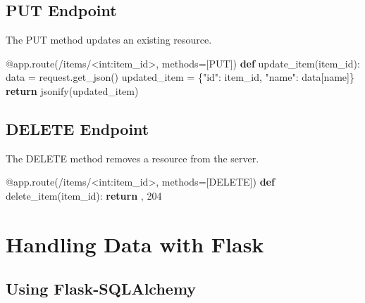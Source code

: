 \documentclass[
  letterpaper,
  DIV=11,
  numbers=noendperiod]{scrreprt}
\newenvironment{Shaded}{\begin{snugshade}}{\end{snugshade}}
\newcommand{\AttributeTok}[1]{\textcolor[rgb]{0.40,0.45,0.13}{#1}}
\newcommand{\ControlFlowTok}[1]{\textcolor[rgb]{0.00,0.23,0.31}{\textbf{#1}}}
\newcommand{\DecValTok}[1]{\textcolor[rgb]{0.68,0.00,0.00}{#1}}
\newcommand{\KeywordTok}[1]{\textcolor[rgb]{0.00,0.23,0.31}{\textbf{#1}}}
\newcommand{\NormalTok}[1]{\textcolor[rgb]{0.00,0.23,0.31}{#1}}
\newcommand{\OperatorTok}[1]{\textcolor[rgb]{0.37,0.37,0.37}{#1}}
\newcommand{\StringTok}[1]{\textcolor[rgb]{0.13,0.47,0.30}{#1}}
\begin{document}
\subsection{PUT Endpoint}\label{put-endpoint}

The PUT method updates an existing resource.

\begin{Shaded}
\begin{Highlighting}[]
\AttributeTok{@app.route}\NormalTok{(}\StringTok{\textquotesingle{}/items/\textless{}int:item\_id\textgreater{}\textquotesingle{}}\NormalTok{, methods}\OperatorTok{=}\NormalTok{[}\StringTok{\textquotesingle{}PUT\textquotesingle{}}\NormalTok{])}
\KeywordTok{def}\NormalTok{ update\_item(item\_id):}
\NormalTok{    data }\OperatorTok{=}\NormalTok{ request.get\_json()}
\NormalTok{    updated\_item }\OperatorTok{=}\NormalTok{ \{}\StringTok{"id"}\NormalTok{: item\_id, }\StringTok{"name"}\NormalTok{: data[}\StringTok{\textquotesingle{}name\textquotesingle{}}\NormalTok{]\}}
    \ControlFlowTok{return}\NormalTok{ jsonify(updated\_item)}
\end{Highlighting}
\end{Shaded}

\subsection{DELETE Endpoint}\label{delete-endpoint}

The DELETE method removes a resource from the server.

\begin{Shaded}
\begin{Highlighting}[]
\AttributeTok{@app.route}\NormalTok{(}\StringTok{\textquotesingle{}/items/\textless{}int:item\_id\textgreater{}\textquotesingle{}}\NormalTok{, methods}\OperatorTok{=}\NormalTok{[}\StringTok{\textquotesingle{}DELETE\textquotesingle{}}\NormalTok{])}
\KeywordTok{def}\NormalTok{ delete\_item(item\_id):}
    \ControlFlowTok{return} \StringTok{\textquotesingle{}\textquotesingle{}}\NormalTok{, }\DecValTok{204}
\end{Highlighting}
\end{Shaded}

\section{Handling Data with Flask}\label{handling-data-with-flask}

\subsection{Using Flask-SQLAlchemy}\label{using-flask-sqlalchemy}
\end{document}
